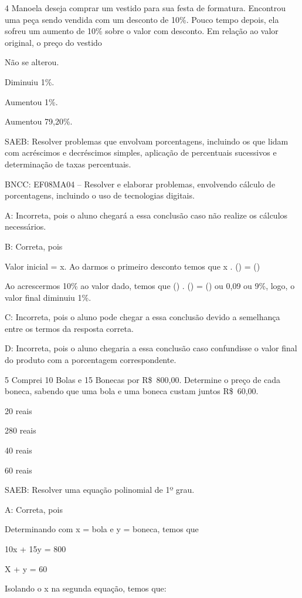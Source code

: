 {\num{4} Manoela deseja comprar um vestido para sua festa de formatura.
Encontrou uma peça sendo vendida com um desconto de 10\%. Pouco tempo
depois, ela sofreu um aumento de 10\% sobre o valor com desconto. Em
relação ao valor original, o preço do vestido
\item Não se alterou.
\item Diminuiu 1\%.
\item Aumentou 1\%.
\item Aumentou 79,20\%.

SAEB: Resolver problemas que envolvam porcentagens, incluindo os que
lidam com acréscimos e decréscimos simples, aplicação de percentuais
sucessivos e determinação de taxas percentuais.

BNCC: EF08MA04 -- Resolver e elaborar problemas, envolvendo cálculo de
porcentagens, incluindo o uso de tecnologias digitais.

A: Incorreta, pois o aluno chegará a essa conclusão caso não realize os
cálculos necessários.

B: Correta, pois

Valor inicial = x. Ao darmos o primeiro desconto temos que x .
() = ()

Ao acrescermos 10\% ao valor dado, temos que () .
() = () ou 0,09 ou 9\%, logo, o valor
final diminuiu 1\%.

C: Incorreta, pois o aluno pode chegar a essa conclusão devido a
semelhança entre os termos da resposta correta.

D: Incorreta, pois o aluno chegaria a essa conclusão caso confundisse o
valor final do produto com a porcentagem correspondente.

\num{5} Comprei 10 Bolas e 15 Bonecas por R\$~800,00. Determine o preço de
cada boneca, sabendo que uma bola e uma boneca custam juntos R\$~60,00.
\item 20 reais
\item 280 reais
\item 40 reais
\item 60 reais

SAEB: Resolver uma equação polinomial de 1º grau.

A: Correta, pois

Determinando com x = bola e y = boneca, temos que

10x + 15y = 800

X + y = 60

Isolando o x na segunda equação, temos que:

}
